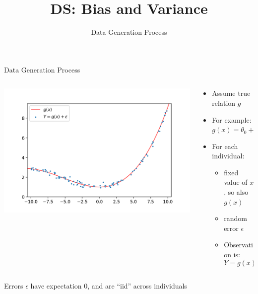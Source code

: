 \documentclass[aspectratio=169]{../latex_main/tntbeamer}  %
\title[Statistics]{DS: Bias and Variance}
\subtitle{Data Generation Process}
\begin{document}
	
	\maketitle
	\begin{frame}{Data Generation Process}
	    \begin{columns}
	        \begin{column}{.4\textwidth}

	                    \includegraphics[scale=.5]{Bild1}

	        \end{column}
	        
	        
	         \begin{column}{.4\textwidth}

	                \begin{itemize}
	                    \item Assume true relation $g$
	                    \item For example: $g(x) = \theta_0 + \theta_1x$
	                    \item For each individual:
	                    \begin{itemize}
	                        \item fixed value of $x$, so also $g(x)$
	                        \item random error $\epsilon$
	                        \item Observation is:
	                        \begin{equation*}
	                            Y = g(x) + \epsilon
	                        \end{equation*}
	                    \end{itemize}
	                \end{itemize}

	        \end{column}
	    \end{columns}
	    Errors $\epsilon$ have expectation 0, and are “iid” across individuals

	\end{frame}
	
\end{document}
